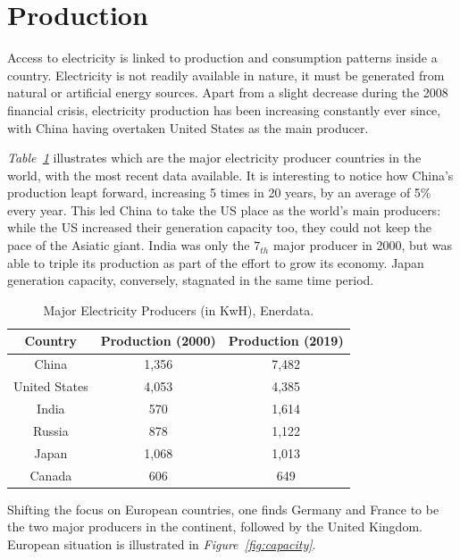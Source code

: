 \documentclass[a4paper,12pt]{book}
\begin{document}
\section{Production}

Access to electricity is linked to production and consumption patterns inside a country. Electricity is not readily available in nature, it must be generated from natural or artificial energy sources. Apart from a slight decrease during the 2008 financial crisis, electricity production has been increasing constantly ever since, with China having overtaken United States as the main producer.

\textit{Table~\ref{Tab:enerdata}} illustrates which are the major electricity producer countries in the world, with the most recent data available. It is interesting to notice how China's production leapt forward, increasing 5 times in 20 years, by an average of 5\% every year. This led China to take the US place as the world's main producers: while the US increased their generation capacity too, they could not keep the pace of the Asiatic giant. India was only the $7_{th}$ major producer in 2000, but was able to triple its production as part of the effort to grow its economy. Japan generation capacity, conversely, stagnated in the same time period.

\begin{table}[hbt]
\begin{center}
\begin{tabular}{|c|c|c|}
\hline
Country & Production (2000) & Production (2019)\\
\hline
China & 1,356 & 7,482\\
United States & 4,053 & 4,385\\
India & 570 & 1,614\\
Russia & 878 & 1,122\\
Japan & 1,068 & 1,013\\
Canada & 606 & 649\\
\hline
\end{tabular}
\caption{Major Electricity Producers (in KwH), Enerdata.}
\label{Tab:enerdata}
\end{center}
\end{table}

Shifting the focus on European countries, one finds Germany and France to be the two major producers in the continent, followed by the United Kingdom. European situation is illustrated in \textit{Figure~\ref{fig:capacity}}.
\end{document}
